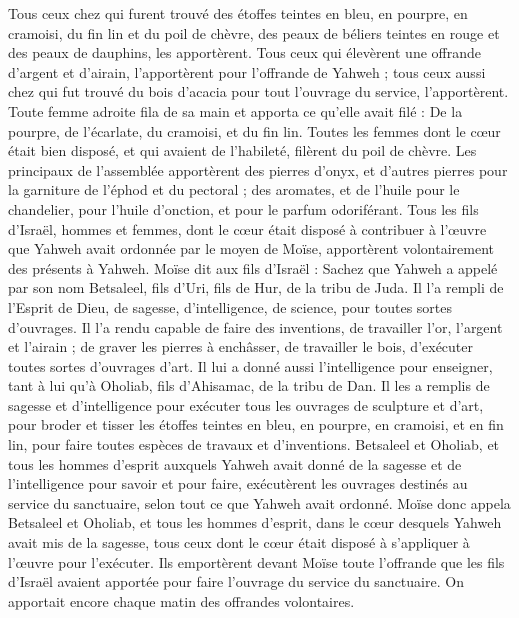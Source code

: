 \begin{multicols}{2}
Tous ceux chez qui furent trouvé des étoffes teintes en bleu, en pourpre, en cramoisi, du fin lin et du poil de chèvre, des peaux de béliers teintes en rouge et des peaux de dauphins, les apportèrent.
Tous ceux qui élevèrent une offrande d'argent et d'airain, l’apportèrent pour l'offrande de Yahweh ; tous ceux aussi chez qui fut trouvé du bois d’acacia pour tout l'ouvrage du service, l'apportèrent.
Toute femme adroite fila de sa main et apporta ce qu'elle avait filé : De la pourpre, de l'écarlate, du cramoisi, et du fin lin.
Toutes les femmes dont le cœur était bien disposé, et qui avaient de l’habileté, filèrent du poil de chèvre.
Les principaux de l'assemblée apportèrent des pierres d'onyx, et d’autres pierres pour la garniture de l'éphod et du pectoral ;
des aromates, et de l'huile pour le chandelier, pour l'huile d'onction, et pour le parfum odoriférant.
Tous les fils d’Israël, hommes et femmes, dont le cœur était disposé à contribuer à l’œuvre que Yahweh avait ordonnée par le moyen de Moïse, apportèrent volontairement des présents à Yahweh.
Moïse dit aux fils d'Israël : Sachez que Yahweh a appelé par son nom Betsaleel, fils d'Uri, fils de Hur, de la tribu de Juda.
Il l'a rempli de l'Esprit de Dieu, de sagesse, d’intelligence, de science, pour toutes sortes d'ouvrages.
Il l’a rendu capable de faire des inventions, de travailler l’or, l’argent et l’airain ;
de graver les pierres à enchâsser, de travailler le bois, d’exécuter toutes sortes d’ouvrages d’art.
Il lui a donné aussi l’intelligence pour enseigner, tant à lui qu'à Oholiab, fils d'Ahisamac, de la tribu de Dan.
Il les a remplis de sagesse et d’intelligence pour exécuter tous les ouvrages de sculpture et d’art, pour broder et tisser les étoffes teintes en bleu, en pourpre, en cramoisi, et en fin lin, pour faire toutes espèces de travaux et d’inventions.
\VerseOne{}Betsaleel et Oholiab, et tous les hommes d'esprit auxquels Yahweh avait donné de la sagesse et de l'intelligence pour savoir et pour faire, exécutèrent les ouvrages destinés au service du sanctuaire, selon tout ce que Yahweh avait ordonné.
Moïse donc appela Betsaleel et Oholiab, et tous les hommes d'esprit, dans le cœur desquels Yahweh avait mis de la sagesse, tous ceux dont le cœur était disposé à s’appliquer à l’œuvre pour l’exécuter.
Ils emportèrent devant Moïse toute l'offrande que les fils d'Israël avaient apportée pour faire l'ouvrage du service du sanctuaire. On apportait encore chaque matin des offrandes volontaires.

\end{multicols}
